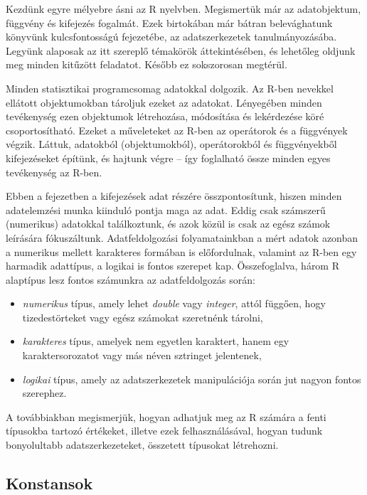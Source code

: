 \documentclass[
]{book}
\providecommand{\tightlist}{%
  \setlength{\itemsep}{0pt}\setlength{\parskip}{0pt}}
\begin{document}
Kezdünk egyre mélyebre ásni az R nyelvben. Megismertük már az adatobjektum, függvény és kifejezés fogalmát. Ezek birtokában már bátran belevághatunk könyvünk kulcsfontosságú fejezetébe, az adatszerkezetek tanulmányozásába. Legyünk alaposak az itt szereplő témakörök áttekintésében, és lehetőleg oldjunk meg minden kitűzött feladatot. Később ez sokszorosan megtérül.

Minden statisztikai programcsomag adatokkal dolgozik. Az R-ben nevekkel ellátott objektumokban tároljuk ezeket az adatokat. Lényegében minden tevékenység ezen objektumok létrehozása, módosítása és lekérdezése köré csoportosítható. Ezeket a műveleteket az R-ben az operátorok és a függvények végzik. Láttuk, adatokból (objektumokból), operátorokból és függvényekből kifejezéseket építünk, és hajtunk végre -- így foglalható össze minden egyes tevékenység az R-ben.

Ebben a fejezetben a kifejezések adat részére összpontosítunk, hiszen minden adatelemzési munka kiinduló pontja maga az adat. Eddig csak számszerű (numerikus) adatokkal találkoztunk, és azok közül is csak az egész számok leírására fókuszáltunk. Adatfeldolgozási folyamatainkban a mért adatok azonban a numerikus mellett karakteres formában is előfordulnak, valamint az R-ben egy harmadik adattípus, a logikai is fontos szerepet kap. Összefoglalva, három R alaptípus lesz fontos számunkra az adatfeldolgozás során:

\begin{itemize}
\tightlist
\item
  \emph{numerikus} típus, amely lehet \emph{double} vagy \emph{integer}, attól függően, hogy tizedestörteket vagy egész számokat szeretnénk tárolni,
\item
  \emph{karakteres} típus, amelyek nem egyetlen karaktert, hanem egy karaktersorozatot vagy más néven sztringet jelentenek,
\item
  \emph{logikai} típus, amely az adatszerkezetek manipulációja során jut nagyon fontos szerephez.
\end{itemize}

A továbbiakban megismerjük, hogyan adhatjuk meg az R számára a fenti típusokba tartozó értékeket, illetve ezek felhasználásával, hogyan tudunk bonyolultabb adatszerkezeteket, összetett típusokat létrehozni.

\hypertarget{konstansok}{%
\subsection{Konstansok}\label{konstansok}}
\end{document}
